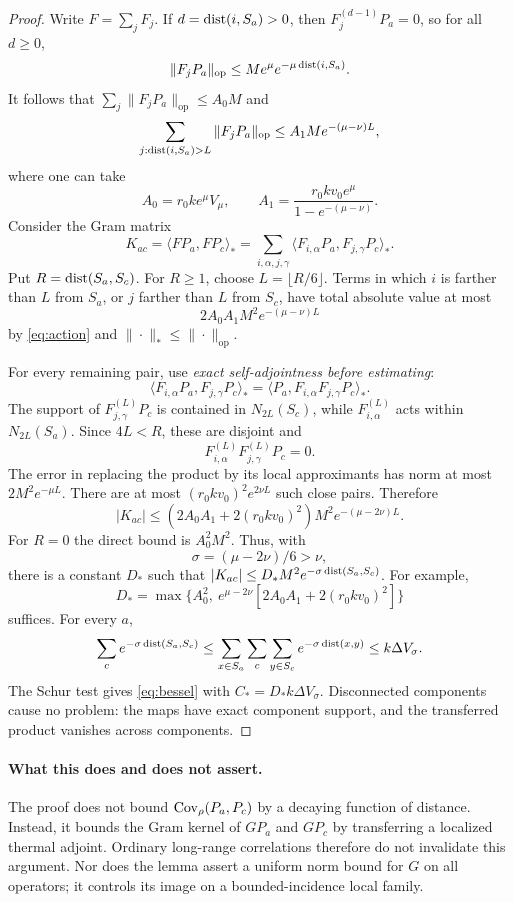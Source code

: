\documentclass[11pt]{article}
\theoremstyle{remark}\newtheorem{remark}[theorem]{Remark}
\newcommand{\op}[1]{\|#1\|_{\mathrm{op}}}
\begin{document}
\begin{proof}
Write $F=\sum_jF_j$. If $d=\operatorname{dist}(i,S_a)>0$, then $F_j^{(d-1)}P_a=0$, so for all $d\ge0$,
\begin{equation}\label{eq:action}
 \op{F_jP_a}\le Me^\mu e^{-\mu\dist(i,S_a)}.
\end{equation}
It follows that $\sum_j\op{F_jP_a}\le A_0M$ and
\[
 \sum_{j:\dist(i,S_a)>L}\op{F_jP_a}
 \le A_1M e^{-(\mu-\nu)L},
\]
where one can take
\[
 A_0=r_0 k e^\mu V_\mu,\qquad
 A_1=\frac{r_0kv_0 e^\mu}{1-e^{-(\mu-\nu)}}.
\]
Consider the Gram matrix
\[
 K_{ac}=\langle FP_a,FP_c\rangle_*
 =\sum_{i,\alpha,j,\gamma}
 \langle F_{i,\alpha}P_a,F_{j,\gamma}P_c\rangle_*.
\]
Put $R=\operatorname{dist}(S_a,S_c)$. For $R\ge1$, choose $L=\lfloor R/6\rfloor$. Terms in which $i$ is farther than $L$ from $S_a$, or $j$ farther than $L$ from $S_c$, have total absolute value at most
\[
 2A_0A_1 M^2e^{-(\mu-\nu)L}
\]
by \eqref{eq:action} and $\|\cdot\|_*\le\|\cdot\|_{\mathrm{op}}$.

For every remaining pair, use \emph{exact self-adjointness before estimating}:
\begin{equation}\label{eq:transferadjoint}
 \langle F_{i,\alpha}P_a,F_{j,\gamma}P_c\rangle_*
 =\langle P_a,F_{i,\alpha}F_{j,\gamma}P_c\rangle_*.
\end{equation}
The support of $F_{j,\gamma}^{(L)}P_c$ is contained in $N_{2L}(S_c)$, while $F_{i,\alpha}^{(L)}$ acts within $N_{2L}(S_a)$. Since $4L<R$, these are disjoint and
\[
 F_{i,\alpha}^{(L)}F_{j,\gamma}^{(L)}P_c=0.
\]
The error in replacing the product by its local approximants has norm at most $2M^2e^{-\mu L}$. There are at most $(r_0kv_0)^2e^{2\nu L}$ such close pairs. Therefore
\[
 |K_{ac}|\le
 \left(2A_0A_1+2(r_0kv_0)^2\right)M^2e^{-(\mu-2\nu)L}.
\]
For $R=0$ the direct bound is $A_0^2M^2$. Thus, with
\[
 \sigma=(\mu-2\nu)/6>\nu,
\]
there is a constant $D_*$ such that $|K_{ac}|\le D_*M^2e^{-\sigma\operatorname{dist}(S_a,S_c)}$. For example,
\[
 D_*=\max\{A_0^2,\ e^{\mu-2\nu}[2A_0A_1+2(r_0kv_0)^2]\}
\]
suffices. For every $a$,
\[
 \sum_c e^{-\sigma\operatorname{dist}(S_a,S_c)}
 \le\sum_{x\in S_a}\sum_c\sum_{y\in S_c}e^{-\sigma\operatorname{dist}(x,y)}
 \le k\Delta V_\sigma.
\]
The Schur test gives \eqref{eq:bessel} with $C_*=D_*k\Delta V_\sigma$. Disconnected components cause no problem: the maps have exact component support, and the transferred product vanishes across components.
\end{proof}

\paragraph{What this does and does not assert.}
The proof does not bound $\operatorname{Cov}_\rho(P_a,P_c)$ by a decaying function of distance. Instead, it bounds the Gram kernel of $GP_a$ and $GP_c$ by transferring a localized thermal adjoint. Ordinary long-range correlations therefore do not invalidate this argument. Nor does the lemma assert a uniform norm bound for $G$ on all operators; it controls its image on a bounded-incidence local family.
\end{document}
